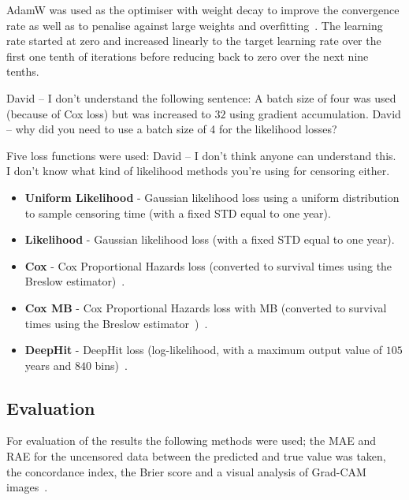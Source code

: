         AdamW was used as the optimiser with weight decay to improve the convergence rate as well as to penalise against large weights and overfitting~\cite{Loshchilov2019DecoupledRegularization}. The learning rate started at zero and increased linearly to the target learning rate over the first one tenth of iterations before reducing back to zero over the next nine tenths.

        David -- I don't understand the following sentence: A batch size of four was used (because of Cox loss) but was increased to $32$ using gradient accumulation. David -- why did you need to use a batch size of 4 for the likelihood losses?

        Five loss functions were used: David -- I don't think anyone can understand this. I don't know what kind of likelihood methods you're using for censoring either. 

        \begin{itemize}
            \item \textbf{Uniform Likelihood} - Gaussian likelihood loss using a uniform distribution to sample censoring time (with a fixed \gls{STD} equal to one year).

            \item \textbf{Likelihood} - Gaussian likelihood loss (with a fixed \gls{STD} equal to one year).

            \item \textbf{Cox} - Cox Proportional Hazards loss (converted to survival times using the Breslow estimator)~\cite{Cox1972RegressionLife-Tables}.

            \item \textbf{Cox \gls{MB}} - Cox Proportional Hazards loss with \gls{MB} (converted to survival times using the Breslow estimator~\cite{Breslow1974CovarianceData})~\cite{Shahin2022SurvivalData}.

            \item \textbf{DeepHit} - DeepHit loss (log-likelihood, with a maximum output value of $105$ years and $840$ bins)~\cite{Lee2018DeepHit:Risks}.
        \end{itemize}

    \subsection{Evaluation} \label{sec:evaluation}
        For evaluation of the results the following methods were used; the \gls{MAE} and \gls{RAE} for the uncensored data between the predicted and true value was taken, the concordance index, the Brier score and a visual analysis of Grad-CAM images~\cite{Raykar2008OnIndex, Gerds2006ConsistentTimes, Selvaraju2020Grad-CAM:Localization}.
